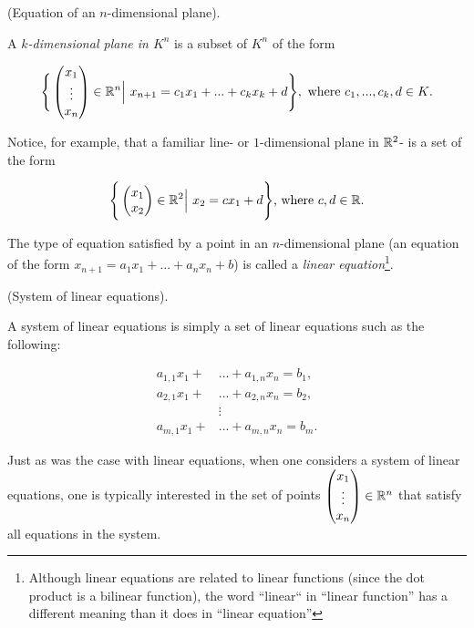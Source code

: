 \begin{deriv}
    (Equation of an $n$-dimensional plane).

    A \textit{$k$-dimensional plane in $K^n$} is a subset of $K^n$ of the form

    \begin{align*}
        \Bigg\{ \begin{pmatrix} x_1 \\ \vdots \\ x_n \end{pmatrix} \in \mathbb{R}^n \Big| \text{ } x_{n + 1} = c_1 x_1 + ... + c_k x_k + d \Bigg\}, \text{ where $c_1, ..., c_k, d \in K$}.
    \end{align*}

    Notice, for example, that a familiar line- or $1$-dimensional plane in $\mathbb{R}^2$- is a set of the form

    \begin{align*}
        \Bigg\{ \begin{pmatrix} x_1 \\ x_2 \end{pmatrix} \in \mathbb{R}^2 \Big| \text{ } x_2 = c x_1 + d \Bigg\} \text{, where $c, d \in \mathbb{R}$}.
    \end{align*}

    The type of equation satisfied by a point in an $n$-dimensional plane (an equation of the form $x_{n + 1} = a_1 x_1 + ... + a_n x_n + b$) is called a \textit{linear equation}\footnote{Although linear equations are related to linear functions (since the dot product is a bilinear function), the word ``linear`` in ``linear function'' has a different meaning than it does in ``linear equation''}. 
\end{deriv}

\begin{defn}
    (System of linear equations).
    
    A system of linear equations is simply a set of linear equations such as the following:
    
    \begin{align*}
        a_{1,1} x_1 + &... + a_{1,n} x_n = b_1, \\
        a_{2,1} x_1 + &... + a_{2,n} x_n = b_2, \\
        &\vdots \\
        a_{m,1} x_1 + &... + a_{m,n} x_n = b_m.
    \end{align*}
    
    Just as was the case with linear equations, when one considers a system of linear equations, one is typically interested in the set of points  $\begin{pmatrix} x_1 \\ \vdots \\ x_n \end{pmatrix} \in \mathbb{R}^n$ that satisfy all equations in the system.
\end{defn}

